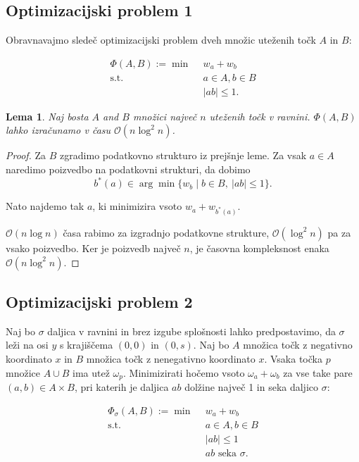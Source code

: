 \documentclass[a4paper, 12pt]{book}
\newcommand{\OO}{\ensuremath{\mathcal{O}}} %
\newtheorem{lema}[izrek]{Lema}
\begin{document}
\subsection{Optimizacijski problem 1}
Obravnavajmo sledeč optimizacijski problem dveh množic uteženih točk $A$ in $B$:

\begin{align*}
	\Phi(A,B) :=\min ~~		& w_a+w_b\\
	 \mbox{s.t.}~~ & a \in A, b\in B\\
				&	|ab|\le 1. 
\end{align*}

\begin{lema}
\label{le:within}
	Naj bosta $A$ and $B$ množici največ $n$ uteženih točk v ravnini.
	$\Phi(A,B)$ lahko izračunamo v času $\OO(n\log^2 n)$.
\end{lema}
\begin{proof}
Za $B$ zgradimo podatkovno strukturo iz prejšnje leme. Za vsak $a\in A$  naredimo poizvedbo na podatkovni strukturi, da dobimo
\[	
		b^*(a) \in \arg\min \{ w_b \mid b\in B,~|ab|\le 1\}.
	\]
	
Nato najdemo tak $a$, ki minimizira vsoto $w_a+w_{b^*(a)}$.

$\OO(n\log n)$ časa rabimo za izgradnjo podatkovne strukture, $\OO(\log^2 n)$ pa za vsako poizvedbo. Ker je poizvedb največ $n$, je časovna kompleksnost enaka $\OO(n\log^2 n)$.
\end{proof}



\subsection{Optimizacijski problem 2}

Naj bo $\sigma$ daljica v ravnini in brez izgube splošnosti lahko predpostavimo, da $\sigma$ leži na osi $y$ s krajiščema $(0,0)$ in $(0,s)$. Naj bo $A$ množica točk z negativno koordinato $x$ in $B$ množica točk z nenegativno koordinato $x$. Vsaka točka $p$ množice $A \cup B$ ima utež $\omega_p$. Minimizirati hočemo vsoto $\omega_a + \omega_b$ za vse take pare $(a,b) \in A \times B$, pri katerih je daljica $ab$ dolžine največ 1 in seka daljico $\sigma$:

\begin{align*}
	\Phi_\sigma(A,B) :=\min ~~		& w_a+w_b\\
	 \mbox{s.t.}~~ & a\in A, b\in B\\
				&	|ab|\le 1\\
				&	\mbox{$ab$ seka $\sigma$}. 
\end{align*}
\end{document}
